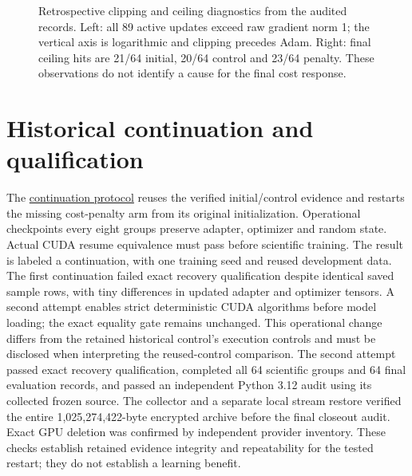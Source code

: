 \documentclass[11pt]{article}
\begin{document}
\begin{figure}[htbp]
\caption{Retrospective clipping and ceiling diagnostics from the audited records. Left: all 89 active updates exceed raw gradient norm 1; the vertical axis is logarithmic and clipping precedes Adam. Right: final ceiling hits are 21/64 initial, 20/64 control and 23/64 penalty. These observations do not identify a cause for the final cost response.}
\label{fig:clipping-ceilings}
\end{figure}

\section{Historical continuation and qualification}

The \href{https://github.com/arpjw/reward-function/blob/research-v1.1.0/docs/REWARD_CONTINUATION.md}{continuation protocol} reuses the verified initial/control evidence and restarts the missing cost-penalty arm from its original initialization. Operational checkpoints every eight groups preserve adapter, optimizer and random state. Actual CUDA resume equivalence must pass before scientific training. The result is labeled a continuation, with one training seed and reused development data. The first continuation failed exact recovery qualification despite identical saved sample rows, with tiny differences in updated adapter and optimizer tensors. A second attempt enables strict deterministic CUDA algorithms before model loading; the exact equality gate remains unchanged. This operational change differs from the retained historical control's execution controls and must be disclosed when interpreting the reused-control comparison. The second attempt passed exact recovery qualification, completed all 64 scientific groups and 64 final evaluation records, and passed an independent Python 3.12 audit using its collected frozen source. The collector and a separate local stream restore verified the entire 1,025,274,422-byte encrypted archive before the final closeout audit. Exact GPU deletion was confirmed by independent provider inventory. These checks establish retained evidence integrity and repeatability for the tested restart; they do not establish a learning benefit.
\end{document}
